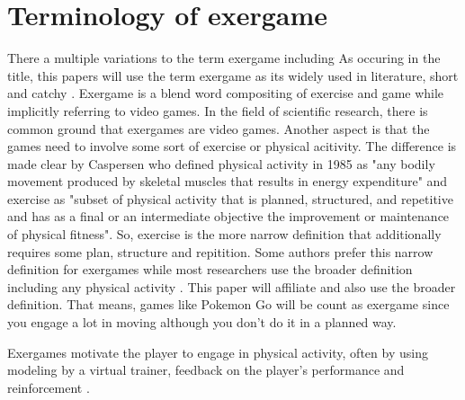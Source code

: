\section{Terminology of exergame}
There a multiple variations to the term exergame including 
As occuring in the title, this papers will use the term exergame as its widely used in literature, short and catchy \cite{oh2010defining}. Exergame is a blend word compositing of exercise and game while implicitly referring to video games. In the field of scientific research, there is common ground that exergames are video games. Another aspect is that the games need to involve some sort of exercise or physical acitivity. The difference is made clear by Caspersen who defined \cite{caspersen1985physical} physical activity in 1985 as "any bodily movement produced by skeletal muscles that results in energy expenditure" and exercise as "subset of physical activity that is planned, structured, and repetitive and has as a final or an intermediate objective the improvement or maintenance of physical fitness". So, exercise is the more narrow definition that additionally requires some plan, structure and repitition. Some authors prefer this narrow definition for exergames while most researchers use the broader definition including any physical activity \cite{oh2010defining}. This paper will affiliate and also use the broader definition. That means, games like Pokemon Go will be count as exergame since you engage a lot in moving although you don't do it in a planned way.

Exergames motivate the player to engage in physical activity, often by using modeling by a virtual trainer, feedback on the player's performance and reinforcement \cite{lyons13strategies}.
























